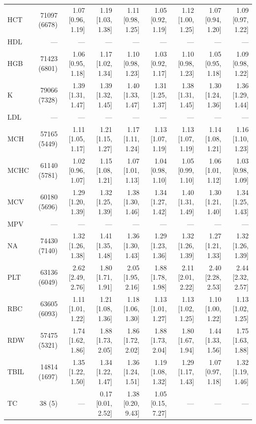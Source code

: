 \begin{table}[ht]
\begin{tabular}{lrrrrrrrr}
HCT & 71097 (6678) & 1.07 [0.96, 1.19] & 1.19 [1.03, 1.38] & 1.11 [0.98, 1.25] & 1.05 [0.92, 1.19] & 1.12 [1.00, 1.25] & 1.07 [0.94, 1.20] & 1.09 [0.97, 1.22] \\
HDL & --- & --- & --- & --- & --- & --- & --- & --- \\
HGB & 71423 (6801) & 1.06 [0.95, 1.18] & 1.17 [1.02, 1.34] & 1.10 [0.98, 1.23] & 1.03 [0.92, 1.17] & 1.10 [0.98, 1.23] & 1.05 [0.95, 1.18] & 1.09 [0.98, 1.22] \\
K & 79066 (7328) & 1.39 [1.31, 1.47] & 1.39 [1.32, 1.45] & 1.40 [1.33, 1.47] & 1.31 [1.25, 1.37] & 1.38 [1.31, 1.45] & 1.30 [1.24, 1.36] & 1.36 [1.29, 1.44] \\
LDL & --- & --- & --- & --- & --- & --- & --- & --- \\
MCH & 57165 (5449) & 1.11 [1.05, 1.17] & 1.21 [1.15, 1.27] & 1.17 [1.11, 1.24] & 1.13 [1.07, 1.19] & 1.13 [1.07, 1.19] & 1.14 [1.08, 1.21] & 1.16 [1.10, 1.23] \\
MCHC & 61140 (5781) & 1.02 [0.96, 1.07] & 1.15 [1.08, 1.21] & 1.07 [1.01, 1.13] & 1.04 [0.98, 1.10] & 1.05 [0.99, 1.10] & 1.06 [1.01, 1.12] & 1.03 [0.98, 1.09] \\
MCV & 60180 (5696) & 1.29 [1.20, 1.39] & 1.32 [1.25, 1.39] & 1.38 [1.30, 1.46] & 1.34 [1.27, 1.42] & 1.40 [1.31, 1.49] & 1.30 [1.21, 1.40] & 1.34 [1.25, 1.43] \\
MPV & --- & --- & --- & --- & --- & --- & --- & --- \\
NA & 74430 (7140) & 1.32 [1.26, 1.38] & 1.41 [1.35, 1.48] & 1.36 [1.30, 1.43] & 1.29 [1.23, 1.36] & 1.32 [1.26, 1.39] & 1.27 [1.21, 1.33] & 1.32 [1.26, 1.39] \\
PLT & 63136 (6049) & 2.62 [2.49, 2.76] & 1.80 [1.71, 1.91] & 2.05 [1.95, 2.16] & 1.88 [1.78, 1.98] & 2.11 [2.01, 2.22] & 2.40 [2.28, 2.53] & 2.44 [2.32, 2.57] \\
RBC & 63605 (6093) & 1.11 [1.01, 1.22] & 1.21 [1.08, 1.36] & 1.18 [1.06, 1.30] & 1.13 [1.01, 1.27] & 1.13 [1.02, 1.25] & 1.10 [1.00, 1.22] & 1.13 [1.02, 1.25] \\
RDW & 57475 (5321) & 1.74 [1.62, 1.86] & 1.88 [1.73, 2.05] & 1.86 [1.72, 2.02] & 1.88 [1.73, 2.04] & 1.80 [1.67, 1.94] & 1.44 [1.33, 1.56] & 1.75 [1.63, 1.88] \\
TBIL & 14814 (1697) & 1.35 [1.22, 1.50] & 1.34 [1.22, 1.47] & 1.36 [1.24, 1.51] & 1.19 [1.08, 1.32] & 1.29 [1.17, 1.43] & 1.07 [0.97, 1.18] & 1.32 [1.19, 1.46] \\
TC & 38 (5) & --- & 0.17 [0.01, 2.52] & 1.38 [0.20, 9.43] & 1.05 [0.15, 7.27] & --- & --- & --- \\

\end{tabular}
\end{table}
